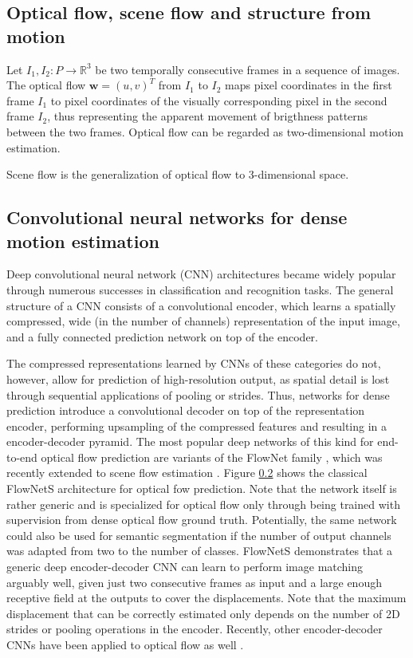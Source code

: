 \subsection{Optical flow, scene flow and structure from motion}
Let $I_1,I_2 : P \to \mathbb{R}^3$ be two temporally consecutive frames in a sequence of images.
The optical flow $\mathbf{w} = (u, v)^T$ from $I_1$ to $I_2$ maps pixel coordinates in the first
frame $I_1$ to pixel coordinates of the visually corresponding pixel in the second frame $I_2$, thus
representing the apparent movement of brigthness patterns between the two frames.
Optical flow can be regarded as two-dimensional motion estimation.

Scene flow is the generalization of optical flow to 3-dimensional space.

\subsection{Convolutional neural networks for dense motion estimation}
Deep convolutional neural network (CNN) architectures \cite{ImageNetCNN, VGGNet, ResNet} became widely popular
through numerous successes in classification and recognition tasks.
The general structure of a CNN consists of a convolutional encoder, which
learns a spatially compressed, wide (in the number of channels) representation of the input image,
and a fully connected prediction network on top of the encoder.

The compressed representations learned by CNNs of these categories do not, however, allow
for prediction of high-resolution output, as spatial detail is lost through sequential applications
of pooling or strides.
Thus, networks for dense prediction introduce a convolutional decoder on top of the representation encoder,
performing upsampling of the compressed features and resulting in a encoder-decoder pyramid.
The most popular deep networks of this kind for end-to-end optical flow prediction
are variants of the FlowNet family \cite{FlowNet, FlowNet2},
which was recently extended to scene flow estimation \cite{SceneFlowDataset}.
Figure \ref{} shows the classical FlowNetS architecture for optical fow prediction.
Note that the network itself is rather generic and is specialized for optical flow only through being trained
with supervision from dense optical flow ground truth.
Potentially, the same network could also be used for semantic segmentation if
the number of output channels was adapted from two to the number of classes. %
FlowNetS demonstrates that a generic deep encoder-decoder CNN can learn to perform image matching arguably well,
given just two consecutive frames as input and a large enough receptive field at the outputs to cover the displacements.
Note that the maximum displacement that can be correctly estimated only depends on the number of 2D strides or pooling
operations in the encoder.
Recently, other encoder-decoder CNNs have been applied to optical flow as well \cite{DenseNetDenseFlow}.


